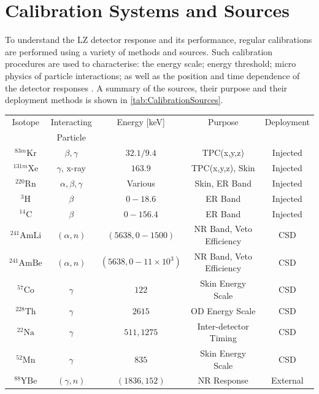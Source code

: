 \section{Calibration Systems and Sources}
To understand the LZ detector response and its performance, regular calibrations are performed using a variety of methods and sources. Such calibration procedures are used to characterise: the energy scale; energy threshold; micro physics of particle interactions; as well as the position and time dependence of the detector responses \cite{LZ:2024bsz}. A summary of the sources, their purpose and their deployment methods is shown in \autoref{tab:CalibrationSources}.
\begin{table}[h!]
    \centering
    \begin{tabular}{|c|c|c|c|c|}
         \hline
         Isotope & Interacting & Energy [keV] & Purpose & Deployment \\
         & Particle & & & \\
         \hline
         $^{83m}\text{Kr}$ & $\beta, \gamma$ & $32.1/9.4$ &TPC(x,y,z) & Injected\\
         $^{131m}\text{Xe}$& $\gamma$, x-ray & $163.9$ & TPC(x,y,z), Skin & Injected\\
         $^{220}\text{Rn}$& $\alpha,\beta,\gamma$ & Various \cite{Jorg:2023nvl} & Skin, ER Band & Injected\\
         $^{3}\text{H}$& $\beta$ & $0-18.6$ &ER Band & Injected\\
         $^{14}\text{C}$& $\beta$ & $0-156.4$ &ER Band & Injected\\
         $^{241}\text{AmLi}$& $(\alpha,n)$ & $(5638, 0-1500)$ & NR Band, Veto Efficiency & CSD\\
         $^{241}\text{AmBe}$& $(\alpha,n)$ & $(5638, 0-11\times10^{3})$ & NR Band, Veto Efficiency & CSD\\
         $^{57}\text{Co}$& $\gamma$ & $122$ &Skin Energy Scale & CSD\\
         $^{228}\text{Th}$& $\gamma$ & $2615$ &OD Energy Scale & CSD\\
         $^{22}\text{Na}$& $\gamma$ & $511, 1275$ &Inter-detector Timing & CSD\\
         $^{52}\text{Mn}$& $\gamma$ & $835$ &Skin Energy Scale & CSD\\
         $^{88}\text{YBe}$& $(\gamma,n)$ & $(1836,152)$ &NR Response & External\\

\end{tabular}
\end{table}
